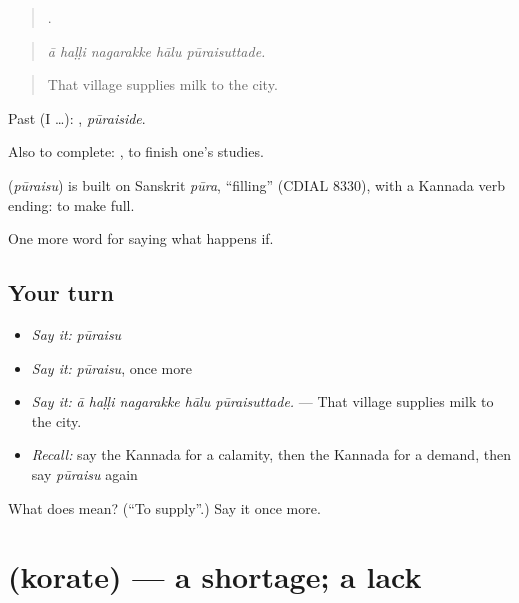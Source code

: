 \begin{quote}
    .
\end{quote}

\begin{quote}
\emph{ā haḷḷi nagarakke hālu pūraisuttade.}
\end{quote}

\begin{quote}
That village supplies milk to the city.
\end{quote}

Past (I …): , \emph{pūraiside}.

Also to complete:  , to finish one's studies.

\begin{cousinweb}
\textbf{} (\emph{pūraisu}) is built on Sanskrit \emph{pūra}, \textquotedblleft{}filling\textquotedblright{} (CDIAL 8330), with a Kannada verb ending: to make full.
\end{cousinweb}

\begin{grammarlens}[title={What you've built}]
One more word for saying what happens if.
\end{grammarlens}

\subsection*{Your turn}
\begin{itemize}
\raggedright
  \item \emph{Say it:} \emph{pūraisu}
  \item \emph{Say it:} \emph{pūraisu}, once more
  \item \emph{Say it:} \emph{ā haḷḷi nagarakke hālu pūraisuttade.} — That village supplies milk to the city.
  \item \emph{Recall:} say the Kannada for a calamity, then the Kannada for a demand, then say \emph{pūraisu} again
\end{itemize}

\begin{tcolorbox}[breakable,colback=teal!4,colframe=teal!35!black,title={Before you move on}]
What does  mean? (\textquotedblleft{}To supply\textquotedblright{}.) Say it once more.
\end{tcolorbox}
\section[\texorpdfstring{\kn{ಕೊರತೆ} (korate)}{ಕೊರತೆ (korate)}]{ (korate) — a shortage; a lack}

